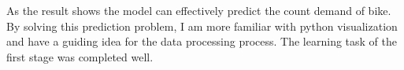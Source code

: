As the result shows the model can effectively predict the count demand of bike. By solving this prediction problem, I am more familiar with python visualization and have a guiding idea for the data processing process. The learning task of the first stage was completed well.






